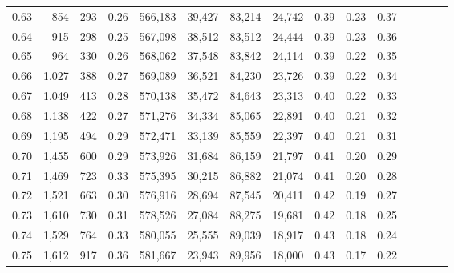 \begin{tabular}{rrrcrrrrrrrrrrr}
0.63 &     854 &    293 &                                       0.26 &  566,183 &   39,427 &   83,214 &   24,742 &  0.39 &  0.23 &                         0.37 \\
0.64 &     915 &    298 &                                       0.25 &  567,098 &   38,512 &   83,512 &   24,444 &  0.39 &  0.23 &                         0.36 \\
0.65 &     964 &    330 &                                       0.26 &  568,062 &   37,548 &   83,842 &   24,114 &  0.39 &  0.22 &                         0.35 \\
0.66 &   1,027 &    388 &                                       0.27 &  569,089 &   36,521 &   84,230 &   23,726 &  0.39 &  0.22 &                         0.34 \\
0.67 &   1,049 &    413 &                                       0.28 &  570,138 &   35,472 &   84,643 &   23,313 &  0.40 &  0.22 &                         0.33 \\
0.68 &   1,138 &    422 &                                       0.27 &  571,276 &   34,334 &   85,065 &   22,891 &  0.40 &  0.21 &                         0.32 \\
0.69 &   1,195 &    494 &                                       0.29 &  572,471 &   33,139 &   85,559 &   22,397 &  0.40 &  0.21 &                         0.31 \\
0.70 &   1,455 &    600 &                                       0.29 &  573,926 &   31,684 &   86,159 &   21,797 &  0.41 &  0.20 &                         0.29 \\
0.71 &   1,469 &    723 &                                       0.33 &  575,395 &   30,215 &   86,882 &   21,074 &  0.41 &  0.20 &                         0.28 \\
0.72 &   1,521 &    663 &                                       0.30 &  576,916 &   28,694 &   87,545 &   20,411 &  0.42 &  0.19 &                         0.27 \\
0.73 &   1,610 &    730 &                                       0.31 &  578,526 &   27,084 &   88,275 &   19,681 &  0.42 &  0.18 &                         0.25 \\
0.74 &   1,529 &    764 &                                       0.33 &  580,055 &   25,555 &   89,039 &   18,917 &  0.43 &  0.18 &                         0.24 \\
0.75 &   1,612 &    917 &                                       0.36 &  581,667 &   23,943 &   89,956 &   18,000 &  0.43 &  0.17 &                         0.22 \\

\end{tabular}
